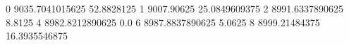 0 9035.7041015625 52.8828125
1 9007.90625 25.0849609375
2 8991.6337890625 8.8125
4 8982.8212890625 0.0
6 8987.8837890625 5.0625
8 8999.21484375 16.3935546875
